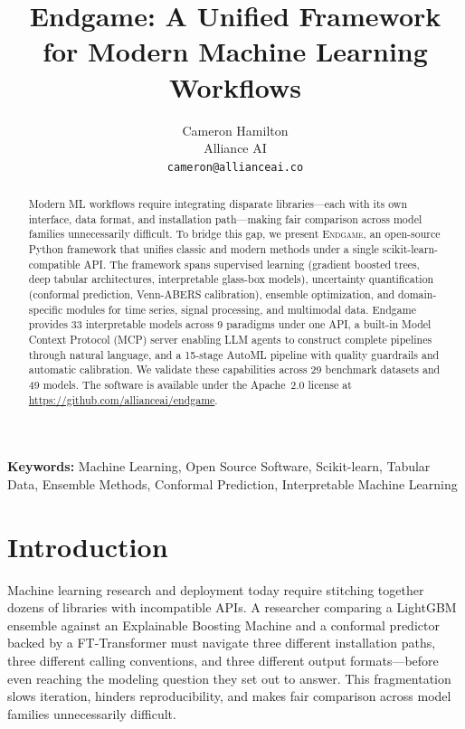 \documentclass[11pt]{article}
\title{Endgame: A Unified Framework for Modern Machine Learning Workflows}
\author{
  Cameron Hamilton \\
  Alliance AI \\
  \texttt{cameron@allianceai.co}
}
\date{}
\begin{document}
\maketitle

\begin{abstract}
Modern ML workflows require integrating disparate libraries---each with its
own interface, data format, and installation path---making fair comparison
across model families unnecessarily difficult. To bridge this gap, we present
\textsc{Endgame}, an open-source Python framework that unifies classic and
modern methods under a single scikit-learn-compatible API. The framework
spans supervised learning (gradient boosted trees, deep tabular
architectures, interpretable glass-box models), uncertainty quantification
(conformal prediction, Venn-ABERS calibration), ensemble optimization, and
domain-specific modules for time series, signal processing, and multimodal
data. Endgame provides 33 interpretable models across 9 paradigms under
one API, a built-in Model Context Protocol (MCP) server enabling LLM agents
to construct complete pipelines through natural language, and a 15-stage
AutoML pipeline with quality guardrails and automatic calibration. We
validate these capabilities across 29 benchmark datasets and 49 models.
The software is available under the Apache~2.0 license at
\url{https://github.com/allianceai/endgame}.
\end{abstract}

\noindent\textbf{Keywords:}
Machine Learning, Open Source Software, Scikit-learn, Tabular Data,
Ensemble Methods, Conformal Prediction, Interpretable Machine Learning

\section{Introduction}
\label{sec:intro}

Machine learning research and deployment today require stitching together
dozens of libraries with incompatible APIs. A researcher comparing a
LightGBM ensemble against an Explainable Boosting Machine and a conformal
predictor backed by a FT-Transformer must navigate three different installation
paths, three different calling conventions, and three different output
formats---before even reaching the modeling question they set out to answer.
This fragmentation slows iteration, hinders reproducibility, and makes fair
comparison across model families unnecessarily difficult.
\end{document}
